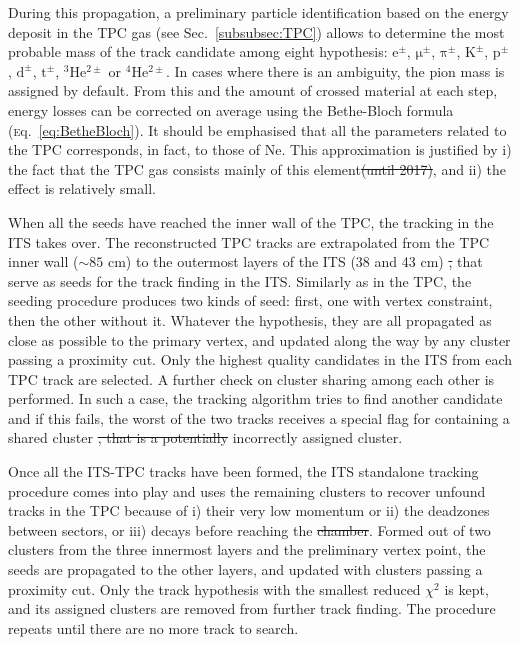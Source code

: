 \documentclass[ALICE,manyauthors]{cernphprep}
\newcommand{\eq}        {\textsc{e}q.~}
\newcommand{\Sec}       {\textsc{S}ec.~}
\newcommand {\unitStyle}[1] {\mbox{\ensuremath{\text{#1}}}}
\newcommand {\cm}       {\unitStyle{cm}\xspace}
\newcommand{\ePlusMinus}    {\mbox{$\mathrm {e^{\pm}}$}}
\newcommand{\muPlusMinus}   {\mbox{$\mathrm {\mu^{\pm}}$}}
\newcommand{\piPlusMinus}   {\mbox{$\mathrm {\pi^{\pm}}$}}
\newcommand{\rmPiPlusMinus} {\piPlusMinus}
\newcommand{\Kplusmin}   {\mbox{$\mathrm {K^{\pm}}$}\xspace}
\newcommand{\pOrPbar}   {\mbox{$\mathrm {p^{\pm}}$}}
\newcommand{\rmDeutonPM} {\mbox{$\mathrm {d}^{\pm}$}}
\newcommand{\rmTritonPM} {\mbox{$\mathrm {t}^{\pm}$}}
\newcommand{\rmHeThreePM}{\mbox{$\mathrm {^3He^{2\pm}}$}\xspace}
\newcommand{\rmHeFourPM} {\mbox{$\mathrm {^4He^{2\pm}}$}\xspace}
\providecommand{\DIFaddtex}[1]{{\protect\color{blue}\uwave{#1}}} %
\providecommand{\DIFdeltex}[1]{{\protect\color{red}\sout{#1}}}                      %
\providecommand{\DIFaddbegin}{} %
\providecommand{\DIFaddend}{} %
\providecommand{\DIFdelbegin}{} %
\providecommand{\DIFdelend}{} %
\providecommand{\DIFadd}[1]{\texorpdfstring{\DIFaddtex{#1}}{#1}} %
\providecommand{\DIFdel}[1]{\texorpdfstring{\DIFdeltex{#1}}{}} %
\newcommand{\DIFscaledelfig}{0.5}
\newlength{\DIFdelgraphicswidth} %
\newlength{\DIFdelgraphicsheight} %
\newcommand{\DIFaddincludegraphics}[2][]{{\color{blue}\fbox{\DIFOincludegraphics[#1]{#2}}}} %
\newcommand{\DIFdelincludegraphics}[2][]{%
\sbox{\DIFdelgraphicsbox}{\DIFOincludegraphics[#1]{#2}}%
\settoboxwidth{\DIFdelgraphicswidth}{\DIFdelgraphicsbox} %
\settoboxtotalheight{\DIFdelgraphicsheight}{\DIFdelgraphicsbox} %
\scalebox{\DIFscaledelfig}{%
\parbox[b]{\DIFdelgraphicswidth}{\usebox{\DIFdelgraphicsbox}\\[-\baselineskip] \rule{\DIFdelgraphicswidth}{0em}}\llap{\resizebox{\DIFdelgraphicswidth}{\DIFdelgraphicsheight}{%
\setlength{\unitlength}{\DIFdelgraphicswidth}%
\begin{picture}(1,1)%
\thicklines\linethickness{2pt} %
{\color[rgb]{1,0,0}\put(0,0){\framebox(1,1){}}}%
{\color[rgb]{1,0,0}\put(0,0){\line( 1,1){1}}}%
{\color[rgb]{1,0,0}\put(0,1){\line(1,-1){1}}}%
\end{picture}%
}\hspace*{3pt}}} %
} %
\DeclareRobustCommand{\DIFaddbegin}{\DIFOaddbegin \let\includegraphics\DIFaddincludegraphics} %
\DeclareRobustCommand{\DIFaddend}{\DIFOaddend \let\includegraphics\DIFOincludegraphics} %
\DeclareRobustCommand{\DIFdelbegin}{\DIFOdelbegin \let\includegraphics\DIFdelincludegraphics} %
\DeclareRobustCommand{\DIFdelend}{\DIFOaddend \let\includegraphics\DIFOincludegraphics} %
\begin{document}
During this propagation, a preliminary particle identification based on the energy deposit in the TPC gas (see \Sec\ref{subsubsec:TPC}) allows to determine the most probable mass of the track candidate among eight hypothesis: \ePlusMinus, \muPlusMinus, \rmPiPlusMinus, \Kplusmin, \pOrPbar, \rmDeutonPM, \rmTritonPM, \rmHeThreePM or \rmHeFourPM. In cases where there is an ambiguity, the pion mass is assigned by default. From this and the amount of crossed material at each step, energy losses can be corrected on average using the Bethe-Bloch formula (\eq\ref{eq:BetheBloch}). It should be emphasised that all the parameters related to the TPC corresponds, in fact, to those of Ne. This approximation is justified by i) the fact that the TPC gas consists mainly of this element\DIFdelbegin \DIFdel{(until 2017)}\DIFdelend , and ii) the effect is relatively small. 

When all the seeds have reached the inner wall of the TPC, the tracking in the ITS takes over. The reconstructed TPC tracks are extrapolated from the TPC inner wall ($\sim 85$ \cm) to the outermost layers of the ITS (\DIFaddbegin \DIFadd{SSDs at }\DIFaddend 38 and 43 \cm) \DIFdelbegin \DIFdel{, }\DIFdelend that serve as seeds for the track finding in the ITS. Similarly as in the TPC, the seeding procedure produces two kinds of seed: first, one with \DIFaddbegin \DIFadd{a }\DIFaddend vertex constraint, then the other without it. Whatever the hypothesis, they are all propagated as close as possible to the primary vertex, and updated along the way by any cluster passing a proximity cut. Only the highest quality candidates in the ITS from each TPC track are selected. A further check on cluster sharing among each other is performed. In such a case, the tracking algorithm tries to find another candidate and if this fails, the worst of the two tracks receives a special flag for containing a shared cluster \DIFdelbegin \DIFdel{, that is a potentially }\DIFdelend \DIFaddbegin \DIFadd{that is potentially an }\DIFaddend incorrectly assigned cluster.

Once all the ITS-TPC tracks have been formed, the ITS standalone tracking procedure comes into play and uses the remaining clusters to recover unfound tracks in the TPC because of i) their very low momentum or ii) the deadzones between sectors, or iii) decays before reaching the \DIFdelbegin \DIFdel{chamber}\DIFdelend \DIFaddbegin \DIFadd{TPC}\DIFaddend . Formed out of two clusters from the three innermost layers and the preliminary vertex point, the seeds are propagated to the other layers, and updated with clusters passing a proximity cut. Only the track hypothesis with the smallest reduced $\chi^{2}$ is kept, and its assigned clusters are removed from further track finding. The procedure repeats until there are no more track to search. 
\end{document}
